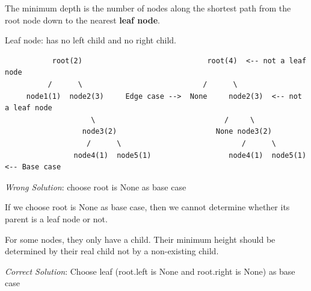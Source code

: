 \documentclass[11pt]{article}
\begin{document}
The minimum depth is the number of nodes along the shortest path from
the root node down to the nearest \textbf{leaf node}.

Leaf node: has no left child and no right child.

\begin{verbatim}
           root(2)                             root(4)  <-- not a leaf node
          /      \                            /      \
     node1(1)  node2(3)     Edge case -->  None     node2(3)  <-- not a leaf node
                    \                              /     \
                  node3(2)                       None node3(2)
                   /      \                            /      \
                node4(1)  node5(1)                  node4(1)  node5(1)  <-- Base case
\end{verbatim}

\emph{Wrong Solution}: choose root is None as base case

If we choose root is None as base case, then we cannot determine whether
its parent is a leaf node or not.

For some nodes, they only have a child. Their minimum height should be
determined by their real child not by a non-existing child.

\emph{Correct Solution}: Choose leaf (root.left is None and root.right
is None) as base case
\end{document}

